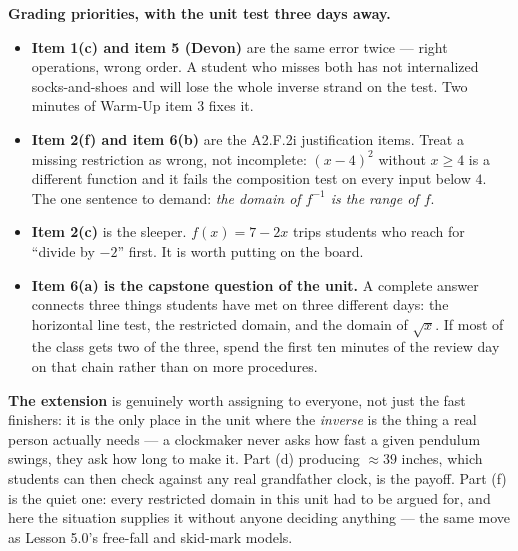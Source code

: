 \documentclass[10pt]{article}
\begin{document}
\begin{teachernote}
\small \textbf{Grading priorities, with the unit test three days away.}
\begin{itemize}[leftmargin=1.3em, nosep]
  \item \textbf{Item 1(c) and item 5 (Devon)} are the same error twice --- right operations, wrong
        order. A student who misses both has not internalized socks-and-shoes and will lose the
        whole inverse strand on the test. Two minutes of Warm-Up item 3 fixes it.
  \item \textbf{Item 2(f) and item 6(b)} are the A2.F.2i justification items. Treat a missing
        restriction as wrong, not incomplete: $(x-4)^{2}$ without $x\ge4$ is a different function
        and it fails the composition test on every input below $4$. The one sentence to demand:
        \emph{the domain of $f^{-1}$ is the range of $f$}.
  \item \textbf{Item 2(c)} is the sleeper. $f(x)=7-2x$ trips students who reach for ``divide by
        $-2$'' first. It is worth putting on the board.
  \item \textbf{Item 6(a) is the capstone question of the unit.} A complete answer connects three
        things students have met on three different days: the horizontal line test, the restricted
        domain, and the domain of $\sqrt{x}$. If most of the class gets two of the three, spend the
        first ten minutes of the review day on that chain rather than on more procedures.
  \end{itemize}
\textbf{The extension} is genuinely worth assigning to everyone, not just the fast finishers: it is
the only place in the unit where the \emph{inverse} is the thing a real person actually needs --- a
clockmaker never asks how fast a given pendulum swings, they ask how long to make it. Part (d)
producing $\approx39$ inches, which students can then check against any real grandfather clock, is
the payoff. Part (f) is the quiet one: every restricted domain in this unit had to be argued for,
and here the situation supplies it without anyone deciding anything --- the same move as Lesson
5.0's free-fall and skid-mark models.
\end{teachernote}
\end{document}
